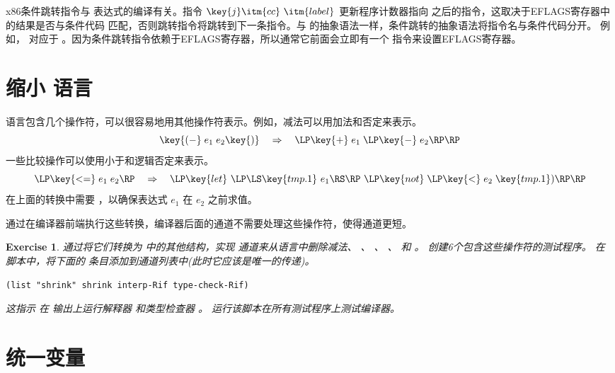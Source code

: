 \documentclass[11pt]{book}
\newtheorem{exercise}[theorem]{Exercise}
\begin{document}
x86条件跳转指令与  表达式的编译有关。指令
$\key{j}\itm{cc}~\itm{label}$ 更新程序计数器指向  之后的指令，这取决于EFLAGS寄存器中的结果是否与条件代码  匹配，否则跳转指令将跳转到下一条指令。与  的抽象语法一样，条件跳转的抽象语法将指令名与条件代码分开。
例如，  对应于  。因为条件跳转指令依赖于EFLAGS寄存器，所以通常它前面会立即有一个  指令来设置EFLAGS寄存器。


\section{缩小 \LangIf{} 语言}
\label{sec:shrink-Rif}

 \LangIf{} 语言包含几个操作符，可以很容易地用其他操作符表示。例如，减法可以用加法和否定来表示。
\[
 \key{(-}\; e_1 \; e_2\key{)} \quad \Rightarrow \quad \LP\key{+} \; e_1 \; \LP\key{-} \; e_2\RP\RP
\]
一些比较操作可以使用小于和逻辑否定来表示。
\[
\LP\key{<=}\; e_1 \; e_2\RP \quad \Rightarrow \quad
\LP\key{let}~\LP\LS\key{tmp.1}~e_1\RS\RP~\LP\key{not}\;\LP\key{<}\;e_2\;\key{tmp.1})\RP\RP
\]
在上面的转换中需要  ，以确保表达式 $e_1$ 在 $e_2$ 之前求值。

通过在编译器前端执行这些转换，编译器后面的通道不需要处理这些操作符，使得通道更短。


\begin{exercise}\normalfont
通过将它们转换为 \LangIf{} 中的其他结构，实现  通道来从语言中删除减法、  、
 、 \key{<=} 、 \key{>} 和 \key{>=} 。
%
创建6个包含这些操作符的测试程序。
%
在  脚本中，将下面的
 条目添加到通道列表中(此时它应该是唯一的传递)。
\begin{lstlisting}
(list "shrink" shrink interp-Rif type-check-Rif)
\end{lstlisting}
这指示  在  输出上运行解释器
 和类型检查器  。
%
运行该脚本在所有测试程序上测试编译器。

\end{exercise}

\section{统一变量}
\label{sec:uniquify-Rif}
\end{document}
